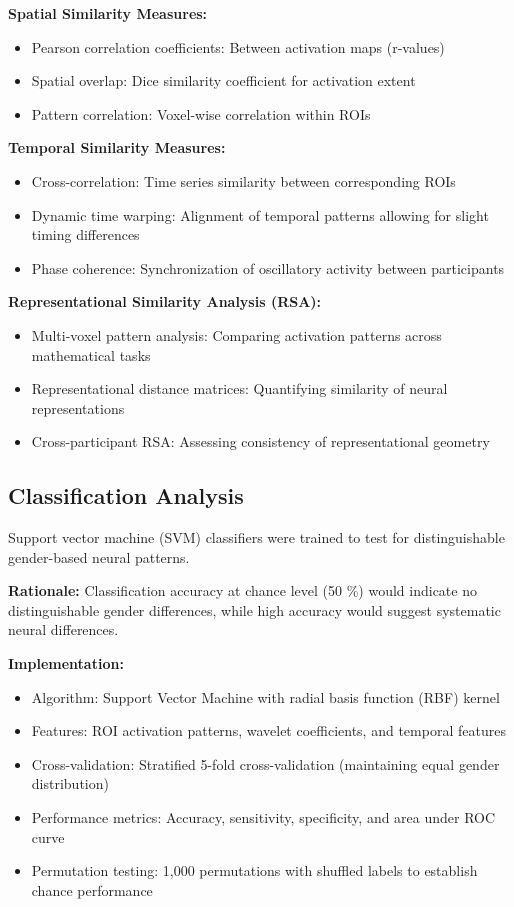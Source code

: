 \documentclass[12pt, a4paper]{article}
\begin{document}
\vspace{0.5\baselineskip}
\noindent
\textbf{Spatial Similarity Measures:}
\begin{itemize}
\item Pearson correlation coefficients: Between activation maps (r-values)
\item Spatial overlap: Dice similarity coefficient for activation extent
\item Pattern correlation: Voxel-wise correlation within ROIs
\end{itemize}

\noindent
\textbf{Temporal Similarity Measures:}
\begin{itemize}
\item Cross-correlation: Time series similarity between corresponding ROIs
\item Dynamic time warping: Alignment of temporal patterns allowing for slight timing differences
\item Phase coherence: Synchronization of oscillatory activity between participants
\end{itemize}

\noindent
\textbf{Representational Similarity Analysis (RSA):}
\begin{itemize}
\item Multi-voxel pattern analysis: Comparing activation patterns across mathematical tasks
\item Representational distance matrices: Quantifying similarity of neural representations
\item Cross-participant RSA: Assessing consistency of representational geometry
\end{itemize}


\subsection{Classification Analysis}
Support vector machine (SVM) classifiers were trained to test for distinguishable gender-based neural patterns.

\vspace{0.5\baselineskip}
\noindent
\textbf{Rationale:} 
Classification accuracy at chance level (50 \%) would indicate no distinguishable gender differences, while high accuracy would suggest systematic neural differences.

\noindent
\textbf{Implementation:}
\begin{itemize}
\item Algorithm: Support Vector Machine with radial basis function (RBF) kernel
\item Features: ROI activation patterns, wavelet coefficients, and temporal features
\item Cross-validation: Stratified 5-fold cross-validation (maintaining equal gender distribution)
\item Performance metrics: Accuracy, sensitivity, specificity, and area under ROC curve
\item Permutation testing: 1,000 permutations with shuffled labels to establish chance performance
\end{itemize}
\end{document}
